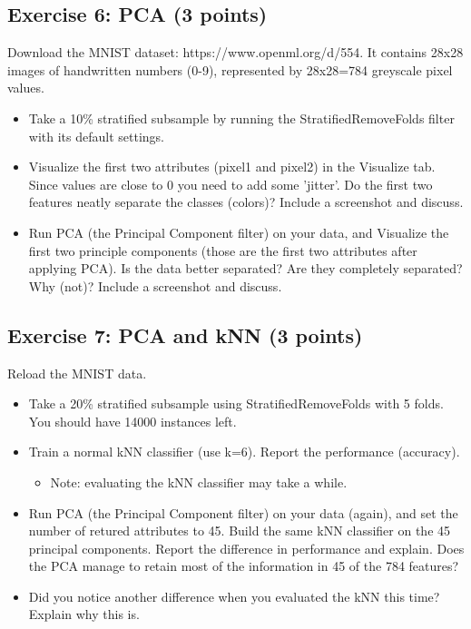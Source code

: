 \documentclass[11pt]{article}
\providecommand{\tightlist}{%
      \setlength{\itemsep}{0pt}\setlength{\parskip}{0pt}}
\begin{document}
    \subsection{Exercise 6: PCA (3 points)}\label{exercise-6-pca-3-points}

Download the MNIST dataset: https://www.openml.org/d/554. It contains
28x28 images of handwritten numbers (0-9), represented by 28x28=784
greyscale pixel values.

\begin{itemize}
\tightlist
\item
  Take a 10\% stratified subsample by running the StratifiedRemoveFolds
  filter with its default settings.
\item
  Visualize the first two attributes (pixel1 and pixel2) in the
  Visualize tab. Since values are close to 0 you need to add some
  'jitter'. Do the first two features neatly separate the classes
  (colors)? Include a screenshot and discuss.
\item
  Run PCA (the Principal Component filter) on your data, and Visualize
  the first two principle components (those are the first two attributes
  after applying PCA). Is the data better separated? Are they completely
  separated? Why (not)? Include a screenshot and discuss.
\end{itemize}

    \subsection{Exercise 7: PCA and kNN (3
points)}\label{exercise-7-pca-and-knn-3-points}

Reload the MNIST data.

\begin{itemize}
\tightlist
\item
  Take a 20\% stratified subsample using StratifiedRemoveFolds with 5
  folds. You should have 14000 instances left.
\item
  Train a normal kNN classifier (use k=6). Report the performance
  (accuracy).

  \begin{itemize}
  \tightlist
  \item
    Note: evaluating the kNN classifier may take a while.
  \end{itemize}
\item
  Run PCA (the Principal Component filter) on your data (again), and set
  the number of retured attributes to 45. Build the same kNN classifier
  on the 45 principal components. Report the difference in performance
  and explain. Does the PCA manage to retain most of the information in
  45 of the 784 features?
\item
  Did you notice another difference when you evaluated the kNN this
  time? Explain why this is.
\end{itemize}


    
    
    
    
\end{document}
